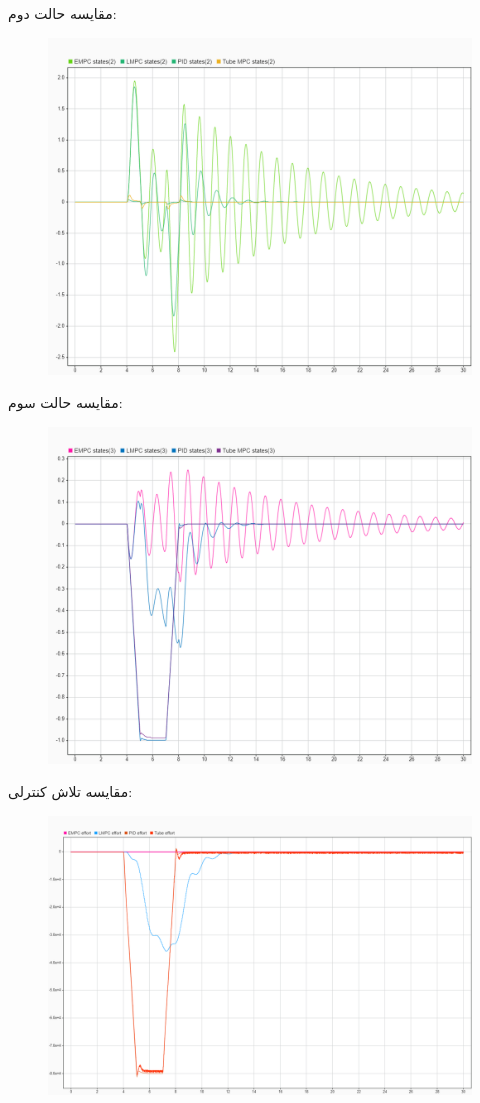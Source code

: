 مقایسه حالت دوم:
\begin{figure}[H]
	\centering
	\includegraphics[width=0.7\linewidth]{../img/30}
	\caption{}
	\label{fig:30}
\end{figure}
مقایسه حالت سوم:
\begin{figure}[H]
	\centering
	\includegraphics[width=0.7\linewidth]{../img/31}
	\caption{}
	\label{fig:31}
\end{figure}
مقایسه تلاش کنترلی:
\begin{figure}[H]
	\centering
	\includegraphics[width=0.7\linewidth]{../img/32}
	\caption{}
	\label{fig:32}
\end{figure}


